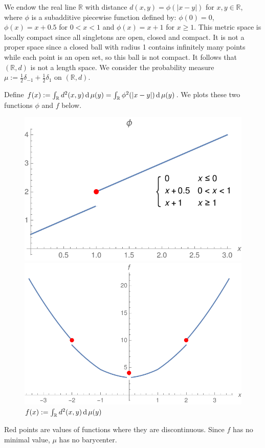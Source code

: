 
\begin{example}
	We endow the real line $\mathbb{R}$ with distance
	$d(x,y) = \phi(|x-y|)$ for $x,y \in \mathbb{R}$,
	where $\phi$ is a subadditive piecewise function defined by:
	$\phi(0) = 0$, $\phi(x) = x + 0.5$ for $ 0 <x <1$ and $\phi(x) = x+1$ for $x \geq 1$.
	This metric space is locally compact since all singletons are open, closed and compact.
	It is not a proper space since a closed ball with radius 1 contains
	infinitely many points while each point is an open set, so this ball is not compact.
	It follows that $(\mathbb{R}, d)$ is not a length space.
	We consider the probability measure $\mu :=\frac{1}{2}\delta_{-1}+ \frac{1}{2}\delta_1$ on $(\mathbb{R}, d)$.

	Define $f(x) := \int_{\mathbb{R}} d^2(x,y) \operatorname{d} \mu(y) = \int_{\mathbb{R}} \phi^2(|x-y|) \operatorname{d} \mu(y)$.
	We plots these two functions $\phi$ and $f$ below.
\begin{figure}[H]
	\centering
	\begin{minipage}{.49\textwidth}
		\centering
		\includegraphics[height=.48\linewidth]{Chapters/example_phi.pdf}
		\caption{$d(x,y):=\phi(|x-y|)$}
	\end{minipage}
	\begin{minipage}{.49\textwidth}
		\centering
		\includegraphics[height=.48\linewidth]{Chapters/example_f.pdf}
		\caption{$f(x) :=\int_{\mathbb{R}} d^2(x,y) \operatorname{d} \mu(y)$}
	\end{minipage}
\end{figure}
	Red points are values of functions where they are discontinuous.
	Since $f$ has no minimal value, $\mu$ has no barycenter.
\end{example}

